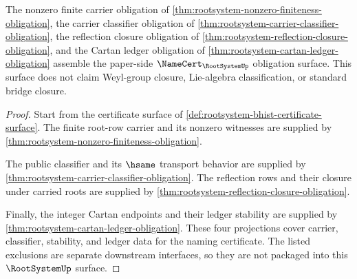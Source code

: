 \begin{theorem}
\label{thm:rootsystem-namecert-obligation-surface}
The nonzero finite carrier obligation of
\autoref{thm:rootsystem-nonzero-finiteness-obligation}, the carrier
classifier obligation of
\autoref{thm:rootsystem-carrier-classifier-obligation}, the reflection
closure obligation of
\autoref{thm:rootsystem-reflection-closure-obligation}, and the Cartan ledger
obligation of \autoref{thm:rootsystem-cartan-ledger-obligation} assemble the
paper-side $\NameCert_{\RootSystemUp}$ obligation surface. This surface does
not claim Weyl-group closure, Lie-algebra classification, or standard bridge
closure.
\end{theorem}
\begin{proof}
Start from the certificate surface of
\autoref{def:rootsystem-bhist-certificate-surface}. The finite root-row
carrier and its nonzero witnesses are supplied by
\autoref{thm:rootsystem-nonzero-finiteness-obligation}.

The public classifier and its $\hsame$ transport behavior are supplied by
\autoref{thm:rootsystem-carrier-classifier-obligation}. The reflection rows
and their closure under carried roots are supplied by
\autoref{thm:rootsystem-reflection-closure-obligation}.

Finally, the integer Cartan endpoints and their ledger stability are supplied
by \autoref{thm:rootsystem-cartan-ledger-obligation}. These four projections
cover carrier, classifier, stability, and ledger data for the naming
certificate. The listed exclusions are separate downstream interfaces, so
they are not packaged into this $\RootSystemUp$ surface.
\end{proof}

